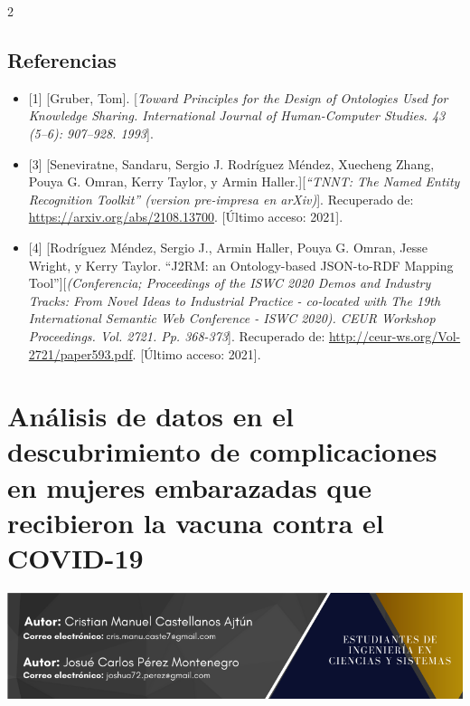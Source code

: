 \documentclass[12pt,spanish,Letterpaper,openany]{book}
\begin{document}
\begin {multicols}{2}
\hypertarget{referencias-7}{%
\section{Referencias}\label{referencias-7}}

\begin{itemize}
\item
  {[}1{]} {[}Gruber, Tom{]}. {[}\emph{Toward Principles for the Design of Ontologies Used for Knowledge Sharing. International Journal of Human-Computer Studies. 43 (5--6): 907--928. 1993}{]}.
\item
  {[}3{]} {[}Seneviratne, Sandaru, Sergio J. Rodríguez Méndez, Xuecheng Zhang, Pouya G. Omran, Kerry Taylor, y Armin Haller.{]}{[}\emph{``TNNT: The Named Entity Recognition Toolkit'' (version pre-impresa en arXiv)}{]}. Recuperado de: \url{https://arxiv.org/abs/2108.13700}. {[}Último acceso: 2021{]}.
\item
  {[}4{]} {[}Rodríguez Méndez, Sergio J., Armin Haller, Pouya G. Omran, Jesse Wright, y Kerry Taylor. ``J2RM: an Ontology-based JSON-to-RDF Mapping Tool''{]}{[}\emph{(Conferencia; Proceedings of the ISWC 2020 Demos and Industry Tracks: From Novel Ideas to Industrial Practice - co-located with The 19th International Semantic Web Conference - ISWC 2020). CEUR Workshop Proceedings. Vol. 2721. Pp. 368-373}{]}. Recuperado de: \url{http://ceur-ws.org/Vol-2721/paper593.pdf}. {[}Último acceso: 2021{]}.
\end{itemize}

\end {multicols}

\hypertarget{pareja9}{%
\chapter{Análisis de datos en el descubrimiento de complicaciones en mujeres embarazadas que recibieron la vacuna contra el COVID-19}\label{pareja9}}

\begin{center}\includegraphics[width=1\linewidth]{images/pareja9_01} \end{center}
\end{document}
